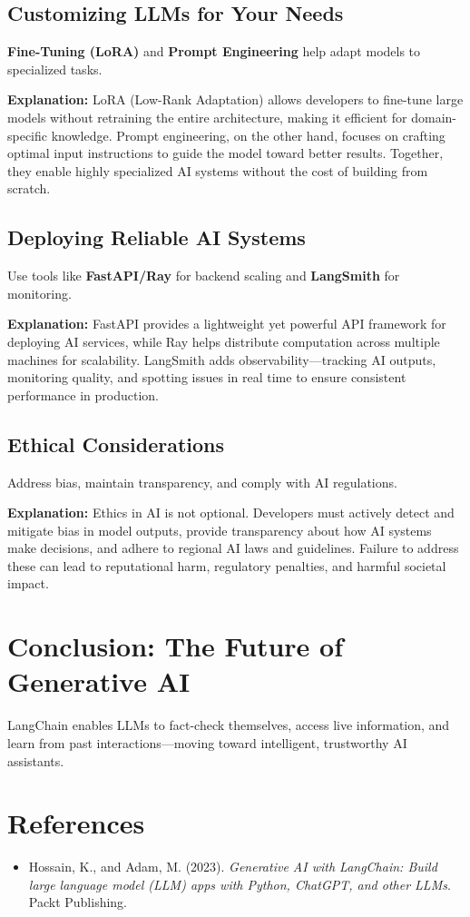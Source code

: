 \documentclass[12pt,a4paper]{article}
\begin{document}
\subsection{Customizing LLMs for Your Needs}
\textbf{Fine-Tuning (LoRA)} and \textbf{Prompt Engineering} help adapt models to specialized tasks.

\noindent\textbf{Explanation:}
LoRA (Low-Rank Adaptation) allows developers to fine-tune large models without retraining the entire architecture, making it efficient for domain-specific knowledge. Prompt engineering, on the other hand, focuses on crafting optimal input instructions to guide the model toward better results. Together, they enable highly specialized AI systems without the cost of building from scratch.

\subsection{Deploying Reliable AI Systems}
Use tools like \textbf{FastAPI/Ray} for backend scaling and \textbf{LangSmith} for monitoring.

\noindent\textbf{Explanation:}
FastAPI provides a lightweight yet powerful API framework for deploying AI services, while Ray helps distribute computation across multiple machines for scalability. LangSmith adds observability—tracking AI outputs, monitoring quality, and spotting issues in real time to ensure consistent performance in production.

\subsection{Ethical Considerations}
Address bias, maintain transparency, and comply with AI regulations.

\noindent\textbf{Explanation:}
Ethics in AI is not optional. Developers must actively detect and mitigate bias in model outputs, provide transparency about how AI systems make decisions, and adhere to regional AI laws and guidelines. Failure to address these can lead to reputational harm, regulatory penalties, and harmful societal impact.

\section*{Conclusion: The Future of Generative AI}
LangChain enables LLMs to fact-check themselves, access live information, and learn from past interactions—moving toward intelligent, trustworthy AI assistants.

\section*{References}
\begin{itemize}
    \item Hossain, K., and Adam, M. (2023). \textit{Generative AI with LangChain: Build large language model (LLM) apps with Python, ChatGPT, and other LLMs}. Packt Publishing.
\end{itemize}
\end{document}
